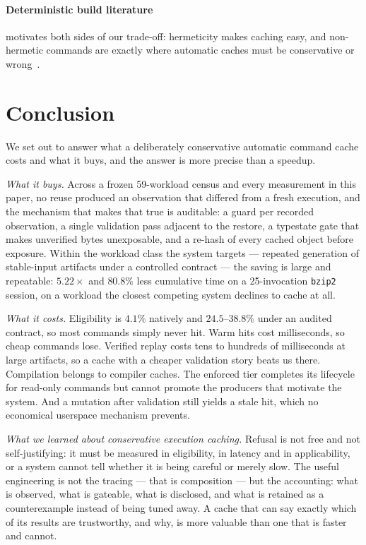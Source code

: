 \paragraph{Deterministic build literature} motivates both sides of our trade-off: hermeticity makes
caching easy, and non-hermetic commands are exactly where automatic caches must be conservative or
wrong~\cite{reproduciblebuilds}.

\section{Conclusion}

We set out to answer what a deliberately conservative automatic command cache costs and what it
buys, and the answer is more precise than a speedup.

\emph{What it buys.} Across a frozen 59-workload census and every measurement in this paper, no
reuse produced an observation that differed from a fresh execution, and the mechanism that makes
that true is auditable: a guard per recorded observation, a single validation pass adjacent to the
restore, a typestate gate that makes unverified bytes unexposable, and a re-hash of every cached
object before exposure. Within the workload class the system targets --- repeated generation of
stable-input artifacts under a controlled contract --- the saving is large and repeatable:
$5.22\times$ and $80.8\%$ less cumulative time on a 25-invocation \texttt{bzip2} session, on a
workload the closest competing system declines to cache at all.

\emph{What it costs.} Eligibility is $4.1\%$ natively and $24.5$--$38.8\%$ under an audited
contract, so most commands simply never hit. Warm hits cost milliseconds, so cheap commands lose.
Verified replay costs tens to hundreds of milliseconds at large artifacts, so a cache with a
cheaper validation story beats us there. Compilation belongs to compiler caches. The enforced tier
completes its lifecycle for read-only commands but cannot promote the producers that motivate the
system. And a mutation after validation still yields a stale hit, which no economical userspace
mechanism prevents.

\emph{What we learned about conservative execution caching.} Refusal is not free and not
self-justifying: it must be measured in eligibility, in latency and in applicability, or a system
cannot tell whether it is being careful or merely slow. The useful engineering is not the tracing
--- that is composition --- but the accounting: what is observed, what is gateable, what is
disclosed, and what is retained as a counterexample instead of being tuned away. A cache that can
say exactly which of its results are trustworthy, and why, is more valuable than one that is faster
and cannot.

